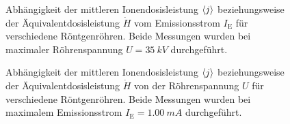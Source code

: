 \documentclass[11pt, a4paper]{article}
\numberwithin{equation}{section}
\begin{document}
\begin{figure}[hp]
	\begin{subfigure}[b]{\textwidth}
		\centering
		
		\label{fig:mo_emissionsstrom_dosis}
	\end{subfigure}
	
	\vspace{10mm}
	
	\begin{subfigure}[b]{\textwidth}
		\centering
		
		\label{fig:cu_emissionsstrom_dosis}
	\end{subfigure}
	\caption{Abhängigkeit der mittleren Ionendosisleistung $\braket{j}$ beziehungsweise der Äquivalentdosisleistung $\dot{H}$ vom Emissionsstrom $I_\mathrm{E}$ für verschiedene Röntgenröhren. Beide Messungen wurden bei maximaler Röhrenspannung $U=\SI{35}{kV}$ durchgeführt.}
	\label{fig:dosis_emissionsstrom}
\end{figure}
\begin{figure}[hp]
	\vspace{-10mm}
	
	\begin{subfigure}[b]{\textwidth}
		\centering
		
		\label{fig:mo_roehrenspannung_dosis}
	\end{subfigure}
	
	\vspace{2.5mm}
	
	\begin{subfigure}[b]{\textwidth}
		\centering
		
		\label{fig:cu_roehrenspannung_dosis}
	\end{subfigure}
	\caption{Abhängigkeit der mittleren Ionendosisleistung $\braket{j}$ beziehungsweise der Äquivalentdosisleistung $\dot{H}$ von der Röhrenspannung $U$ für verschiedene Röntgenröhren. Beide Messungen wurden bei maximalem Emissionsstrom $I_\mathrm{E} = \SI{1.00}{mA}$ durchgeführt.}
	\label{fig:dosis_roehrenspannung}
\end{figure}
\end{document}
